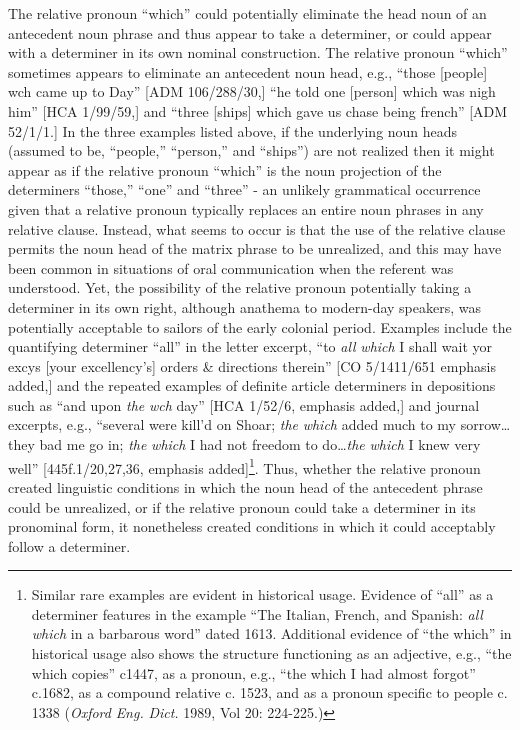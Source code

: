 The relative pronoun “which” could potentially eliminate the head noun of an antecedent noun phrase and thus appear to take a determiner, or could appear with a determiner in its own nominal construction. The relative pronoun “which” sometimes appears to eliminate an antecedent noun head, e.g., “those [people] wch came up to Day” [ADM 106/288/30,] “he told one [person] which was nigh him” [HCA 1/99/59,] and “three [ships] which gave us chase being french” [ADM 52/1/1.] In the three examples listed above, if the underlying noun heads (assumed to be, “people,” “person,” and “ships”) are not realized then it might appear as if the relative pronoun “which” is the noun projection of the determiners “those,” “one” and “three” - an unlikely grammatical occurrence given that a relative pronoun typically replaces an entire noun phrases in any relative clause. Instead, what seems to occur is that the use of the relative clause permits the noun head of the matrix phrase to be unrealized, and this may have been common in situations of oral communication when the referent was understood. Yet, the possibility of the relative pronoun potentially taking a determiner in its own right, although anathema to modern-day speakers, was potentially acceptable to sailors of the early colonial period. Examples include the quantifying determiner “all” in the letter excerpt, “to \textit{all} \textit{which} I shall wait yor excys [your excellency’s] orders \& directions therein” [CO 5/1411/651 emphasis added,] and the repeated examples of definite article determiners in depositions such as “and upon \textit{the} \textit{wch} day” [HCA 1/52/6, emphasis added,] and journal excerpts, e.g., “several were kill’d on Shoar; \textit{the} \textit{which} added much to my sorrow…they bad me go in; \textit{the} \textit{which} I had not freedom to do…\textit{the} \textit{which} I knew very well” [445f.1/20,27,36, emphasis added]\footnote{Similar rare examples are evident in historical usage. Evidence of “all” as a determiner features in the example “The Italian, French, and Spanish: \textit{all} \textit{which} in a barbarous word” dated 1613. Additional evidence of “the which” in historical usage also shows the structure functioning as an adjective, e.g., “the which copies” c1447, as a pronoun, e.g., “the which I had almost forgot” c.1682, as a compound relative c. 1523, and as a pronoun specific to people c. 1338 (\textit{Oxford} \textit{Eng.} \textit{Dict.} 1989, Vol 20: 224-225.)}. Thus, whether the relative pronoun created linguistic conditions in which the noun head of the antecedent phrase could be unrealized, or if the relative pronoun could take a determiner in its pronominal form, it nonetheless created conditions in which it could acceptably follow a determiner. 

